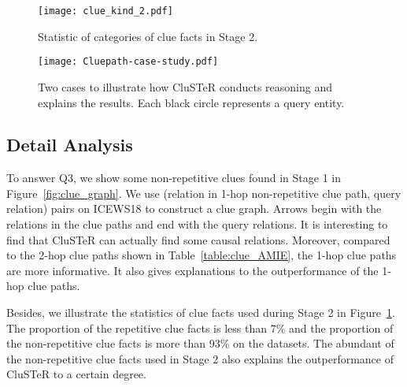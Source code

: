 \documentclass[11pt,a4paper]{article}
\begin{document}
\begin{figure}[tbp] 
  \centering
  \texttt{[image: clue\_kind\_2.pdf]}
  \caption{Statistic of categories of clue facts in Stage 2.}
  \label{fig:clue_kind}
  \vspace{-4mm}
  \end{figure}


  
\begin{figure*}[tbp]
\centering
\texttt{[image: Cluepath-case-study.pdf]}
\vspace{-2mm}
\caption{Two cases to illustrate how CluSTeR conducts reasoning and explains the
results. Each black circle represents a query entity.}
\label{fig:2-stage-case}
\end{figure*}


\subsection{Detail Analysis}\label{Detail Analysis} To answer Q3, we
show some non-repetitive clues found in Stage 1 in
Figure~\ref{fig:clue_graph}. We use (relation in 1-hop
non-repetitive clue path, query relation) pairs on ICEWS18 to
construct a clue graph. Arrows begin with the relations in the clue paths
and end with the query relations. It is interesting to find that CluSTeR can actually
find some causal relations. Moreover, compared to the 2-hop clue paths shown in
Table~\ref{table:clue_AMIE}, the 1-hop clue paths are more informative. It also
gives explanations to the outperformance of the 1-hop clue paths. 

Besides, we illustrate the statistics of clue facts used during Stage 2 in
Figure~\ref{fig:clue_kind}. The proportion of the repetitive clue facts is less
than 7\% and the proportion of the non-repetitive clue facts is more than 93\%
on the datasets. The abundant of the non-repetitive clue facts used in Stage 2 also
explains the outperformance of CluSTeR to a certain degree.



\end{document}

